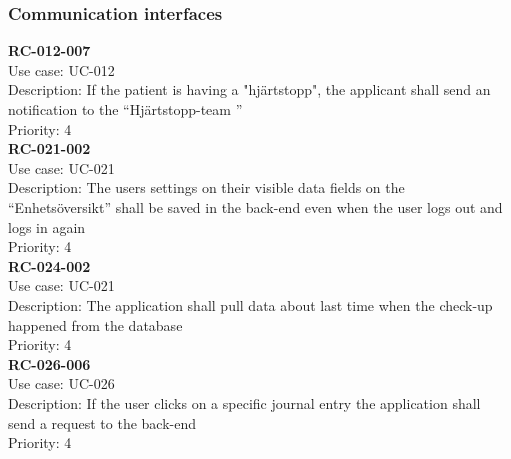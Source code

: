 \subsubsection{Communication interfaces}
\textbf{RC-012-007} \\
Use case: UC-012 \\
Description: If the patient is having a "hjärtstopp", the applicant shall send an notification to the “Hjärtstopp-team ”  \\
Priority: 4 \\
\newline
\textbf{RC-021-002} \\
Use case: UC-021 \\
Description: The users settings on their visible data fields on the “Enhetsöversikt” shall be saved in the back-end even when the user logs out and logs in again  \\
Priority: 4 \\
\newline
\textbf{RC-024-002} \\
Use case: UC-021 \\
Description: The application shall pull data about last time when the check-up happened from the database \\
Priority: 4 \\
\newline
\textbf{RC-026-006} \\
Use case: UC-026 \\
Description: If the user clicks on a specific journal entry the application shall send a request to the back-end\\
Priority: 4 \\
